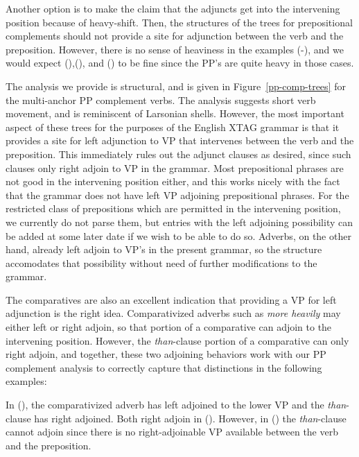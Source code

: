 Another option is to make the claim that the adjuncts get into the
intervening position because of heavy-shift.  Then, the structures of
the trees for prepositional complements should not provide a site for
adjunction between the verb and the preposition.  However, there is no
sense of heaviness in the examples (-), and we would
expect (),(), and () to be fine since the PP's are
quite heavy in those cases.

The analysis we provide is structural, and is given in
Figure~\ref{pp-comp-trees} for the multi-anchor PP complement verbs.
The analysis suggests short verb movement, and is reminiscent of
Larsonian shells.  However, the most important aspect of these trees
for the purposes of the English XTAG grammar is that it provides a
site for left adjunction to VP that intervenes between the verb and
the preposition.  This immediately rules out the adjunct clauses as
desired, since such clauses only right adjoin to VP in the grammar.
Most prepositional phrases are not good in the intervening position
either, and this works nicely with the fact that the grammar does not
have left VP adjoining prepositional phrases.  For the restricted
class of prepositions which are permitted in the intervening position,
we currently do not parse them, but entries with the left adjoining
possibility can be added at some later date if we wish to be able to
do so.  Adverbs, on the other hand, already left adjoin to VP's in the
present grammar, so the structure accomodates that possibility without
need of further modifications to the grammar.

The comparatives are also an excellent indication that providing a VP
for left adjunction is the right idea.  Comparativized adverbs such as
{\it more heavily} may either left or right adjoin, so that portion of
a comparative can adjoin to the intervening position.  However, the
{\it than}-clause portion of a comparative can only right adjoin, and
together, these two adjoining behaviors work with our PP complement
analysis to correctly capture that distinctions in the following
examples:


In (), the comparativized adverb has left adjoined to the lower
VP and the {\it than}-clause has right adjoined.  Both right adjoin in
().  However, in () the {\it than}-clause cannot adjoin
since there is no right-adjoinable VP available between the verb and
the preposition.

